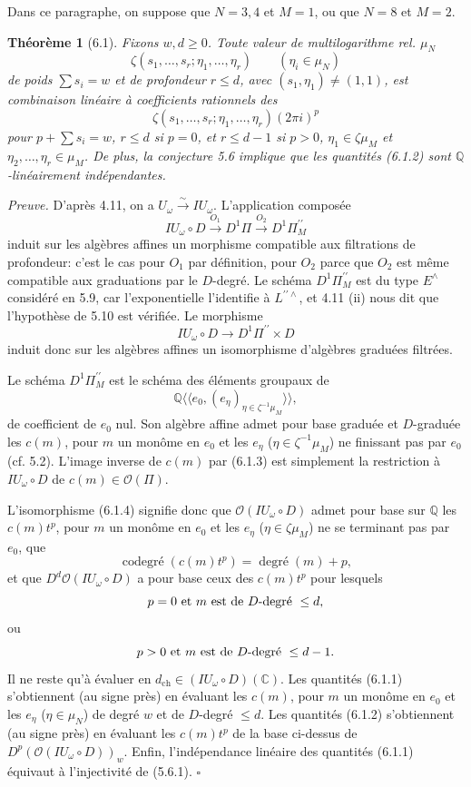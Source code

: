 \documentclass[10pt,a4paper]{article}
\newcommand{\Q}{\mathbb Q}
\newcommand{\OO}{\mathcal O}
\newcommand{\C}{\mathbb C}
\theoremstyle{deligne}
\newtheorem*{theorem*}{Théorème}
\newenvironment{proofdel}{\textit{Preuve.}}{\hfill$\square$}
\begin{document}
Dans ce paragraphe, on suppose que \(N=3,4\) et \(M=1\), ou que \(N=8\) et \(M=2\).

\begin{theorem*}[6.1]
Fixons \(w,d\ge0\). Toute valeur de multilogarithme rel. \(\mu_N\)
\[
\tag{6.1.1}
\zeta(s_1,\ldots,s_r;\eta_1,\ldots,\eta_r)\qquad(\eta_i\in\mu_N)
\]
de poids \(\sum s_i=w\) et de profondeur \(r\le d\), avec \((s_1,\eta_1)\ne(1,1)\), est combinaison linéaire à coefficients rationnels des
\[
\tag{6.1.2}
\zeta(s_1,\ldots,s_r;\eta_1,\ldots,\eta_r)(2\pi i)^p
\]
pour \(p+\sum s_i=w\), \(r\le d\) si \(p=0\), et \(r\le d-1\) si \(p>0\), \(\eta_1\in\zeta\mu_M\) et \(\eta_2,\ldots,\eta_r\in\mu_M\). De plus, la conjecture 5.6 implique que les quantités (6.1.2) sont \(\Q\)-linéairement indépendantes.
\end{theorem*}

\begin{proofdel}
D'après 4.11, on a \(U_\omega\overset{\sim}{\longrightarrow}IU_\omega\). L'application composée
\[
\tag{6.1.3}
IU_\omega\circ D\xrightarrow{O_1}D^1\Pi\xrightarrow{O_2}D^1\Pi_M^{\prime\prime}
\]
induit sur les algèbres affines un morphisme compatible aux filtrations de profondeur: c'est le cas pour \(O_1\) par définition, pour \(O_2\) parce que \(O_2\) est même compatible aux graduations par le \(D\)-degré. Le schéma \(D^1\Pi_M^{\prime\prime}\) est du type \(E^\wedge\) considéré en 5.9, car l'exponentielle l'identifie à \(L^{\prime\prime\wedge}\), et 4.11 (ii) nous dit que l'hypothèse de 5.10 est vérifiée. Le morphisme
\[
\tag{6.1.4}
IU_\omega\circ D\longrightarrow D^1\Pi^{\prime\prime}\times D
\]
induit donc sur les algèbres affines un isomorphisme d'algèbres graduées filtrées.

Le schéma \(D^1\Pi_M^{\prime\prime}\) est le schéma des éléments groupaux de
\[
\Q\langle\!\langle e_0,(e_\eta)_{\eta\in\zeta^{-1}\mu_M}\rangle\!\rangle,
\]
de coefficient de \(e_0\) nul. Son algèbre affine admet pour base graduée et \(D\)-graduée les \(c(m)\), pour \(m\) un monôme en \(e_0\) et les \(e_\eta\) (\(\eta\in\zeta^{-1}\mu_M\)) ne finissant pas par \(e_0\) (cf. 5.2). L'image inverse de \(c(m)\) par (6.1.3) est simplement la restriction à \(IU_\omega\circ D\) de \(c(m)\in\OO(\Pi)\).

L'isomorphisme (6.1.4) signifie donc que \(\OO(IU_\omega\circ D)\) admet pour base sur \(\Q\) les \(c(m)t^p\), pour \(m\) un monôme en \(e_0\) et les \(e_\eta\) (\(\eta\in\zeta\mu_M\)) ne se terminant pas par \(e_0\), que
\[
\operatorname{codegré}(c(m)t^p)=\operatorname{degré}(m)+p,
\]
et que \(D^d\OO(IU_\omega\circ D)\) a pour base ceux des \(c(m)t^p\) pour lesquels
\[
p=0\hbox{ et }m\hbox{ est de }D\hbox{-degré }\le d,
\]
ou
\[
p>0\hbox{ et }m\hbox{ est de }D\hbox{-degré }\le d-1.
\]
Il ne reste qu'à évaluer en \(d_{\mathrm{ch}}\in(IU_\omega\circ D)(\C)\). Les quantités (6.1.1) s'obtiennent (au signe près) en évaluant les \(c(m)\), pour \(m\) un monôme en \(e_0\) et les \(e_\eta\) (\(\eta\in\mu_N\)) de degré \(w\) et de \(D\)-degré \(\le d\). Les quantités (6.1.2) s'obtiennent (au signe près) en évaluant les \(c(m)t^p\) de la base ci-dessus de \(D^p(\OO(IU_\omega\circ D))_w\). Enfin, l'indépendance linéaire des quantités (6.1.1) équivaut à l'injectivité de (5.6.1).
\end{proofdel}
\end{document}
